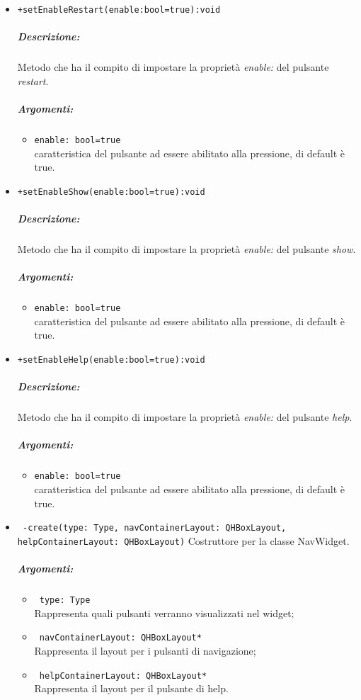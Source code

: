 \begin{itemize}
\item \color{blue}\verb!+setEnableRestart(enable:bool=true):void!
\color{black}
\subparagraph{Descrizione:} Metodo che ha il compito di impostare la proprietà \textit{enable:} del pulsante \textit{restart}.
\subparagraph{Argomenti:}
\begin{itemize}
\item  \color{RoyalPurple} \verb!enable: bool=true !\\ caratteristica del pulsante ad essere abilitato alla pressione, di default è true.
\end{itemize}

\item \color{blue}\verb!+setEnableShow(enable:bool=true):void!
\color{black}
\subparagraph{Descrizione:} Metodo che ha il compito di impostare la proprietà \textit{enable:} del pulsante \textit{show}.
\subparagraph{Argomenti:}
\begin{itemize}
\item  \color{RoyalPurple} \verb!enable: bool=true !\\ caratteristica del pulsante ad essere abilitato alla pressione, di default è true.
\end{itemize}

\item \color{blue}\verb!+setEnableHelp(enable:bool=true):void!
\color{black}
\subparagraph{Descrizione:} Metodo che ha il compito di impostare la proprietà \textit{enable:} del pulsante \textit{help}.
\subparagraph{Argomenti:}
\begin{itemize}
\item  \color{RoyalPurple} \verb!enable: bool=true !\\ caratteristica del pulsante ad essere abilitato alla pressione, di default è true.
\end{itemize}

\item \color{blue}\verb! -create(type: Type, navContainerLayout: QHBoxLayout, helpContainerLayout: QHBoxLayout)!
\color{black}
Costruttore per la classe NavWidget. \\
\subparagraph{Argomenti:}
\begin{itemize}
\item \color{RoyalPurple} \verb! type: Type !\\ Rappresenta quali pulsanti verranno visualizzati nel widget;
\item \color{RoyalPurple} \verb! navContainerLayout: QHBoxLayout* !\\ Rappresenta il layout per i pulsanti di navigazione;
\item \color{RoyalPurple} \verb! helpContainerLayout: QHBoxLayout* !\\ Rappresenta il layout per il pulsante di help.
\end{itemize}

\end{itemize}
\color{black}
\pagebreak

